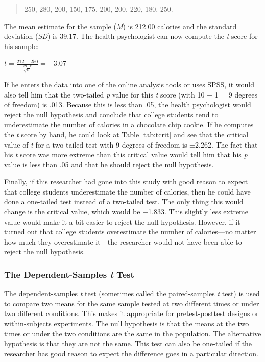 \documentclass[
]{krantz}
\begin{document}
\begin{quote}
250, 280, 200, 150, 175, 200, 200, 220, 180, 250.
\end{quote}

The mean estimate for the sample (\emph{M}) is 212.00 calories and the standard deviation (\emph{SD}) is 39.17. The health psychologist can now compute the \emph{t} score for his sample:

\(t=\frac{212-250}{\frac{39.17}{\sqrt{10}}}=-3.07\)

If he enters the data into one of the online analysis tools or uses SPSS, it would also tell him that the two-tailed \emph{p} value for this \emph{t} score (with 10 − 1 = 9 degrees of freedom) is .013. Because this is less than .05, the health psychologist would reject the null hypothesis and conclude that college students tend to underestimate the number of calories in a chocolate chip cookie. If he computes the \emph{t} score by hand, he could look at Table \ref{tab:tcrit} and see that the critical value of \emph{t} for a two-tailed test with 9 degrees of freedom is ±2.262. The fact that his \emph{t} score was more extreme than this critical value would tell him that his \emph{p} value is less than .05 and that he should reject the null hypothesis.

Finally, if this researcher had gone into this study with good reason to expect that college students underestimate the number of calories, then he could have done a one-tailed test instead of a two-tailed test. The only thing this would change is the critical value, which would be −1.833. This slightly less extreme value would make it a bit easier to reject the null hypothesis. However, if it turned out that college students overestimate the number of calories---no matter how much they overestimate it---the researcher would not have been able to reject the null hypothesis.

\hypertarget{the-dependent-samples-t-test}{%
\subsubsection*{\texorpdfstring{The Dependent-Samples \emph{t} Test}{The Dependent-Samples t Test}}\label{the-dependent-samples-t-test}}


The \protect\hyperlink{dependent-samples-t-test}{dependent-samples \emph{t} test} (sometimes called the paired-samples \emph{t} test) is used to compare two means for the same sample tested at two different times or under two different conditions. This makes it appropriate for pretest-posttest designs or within-subjects experiments. The null hypothesis is that the means at the two times or under the two conditions are the same in the population. The alternative hypothesis is that they are not the same. This test can also be one-tailed if the researcher has good reason to expect the difference goes in a particular direction.
\end{document}
